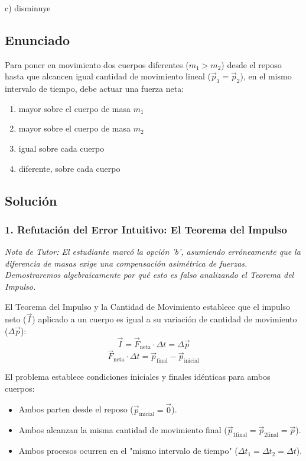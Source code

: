 \documentclass[12pt, a4paper]{article}
\begin{document}
\begin{tcolorbox}[colback=green!5!white, colframe=green!50!black, title=Respuesta Final]
\centering \Large c) disminuye
\end{tcolorbox}

\newpage

\subsection*{Enunciado}
Para poner en movimiento dos cuerpos diferentes ($m_1 > m_2$) desde el reposo hasta que alcancen igual cantidad de movimiento lineal ($\vec{p}_1 = \vec{p}_2$), en el mismo intervalo de tiempo, debe actuar una fuerza neta:
\begin{enumerate}[label=\alph*)]
    \item mayor sobre el cuerpo de masa $m_1$
    \item mayor sobre el cuerpo de masa $m_2$
    \item igual sobre cada cuerpo
    \item diferente, sobre cada cuerpo
\end{enumerate}

\subsection*{Solución}

\subsubsection*{1. Refutación del Error Intuitivo: El Teorema del Impulso}
\textit{Nota de Tutor: El estudiante marcó la opción 'b', asumiendo erróneamente que la diferencia de masas exige una compensación asimétrica de fuerzas. Demostraremos algebraicamente por qué esto es falso analizando el Teorema del Impulso.}

El Teorema del Impulso y la Cantidad de Movimiento establece que el impulso neto ($\vec{I}$) aplicado a un cuerpo es igual a su variación de cantidad de movimiento ($\Delta\vec{p}$):
$$ \vec{I} = \vec{F}_{\text{neta}} \cdot \Delta t = \Delta\vec{p} $$
$$ \vec{F}_{\text{neta}} \cdot \Delta t = \vec{p}_{\text{final}} - \vec{p}_{\text{inicial}} $$

El problema establece condiciones iniciales y finales idénticas para ambos cuerpos:
\begin{itemize}
    \item Ambos parten desde el reposo ($\vec{p}_{\text{inicial}} = \vec{0}$).
    \item Ambos alcanzan la misma cantidad de movimiento final ($\vec{p}_{1\text{final}} = \vec{p}_{2\text{final}} = \vec{p}$).
    \item Ambos procesos ocurren en el "mismo intervalo de tiempo" ($\Delta t_1 = \Delta t_2 = \Delta t$).
\end{itemize}
\end{document}
